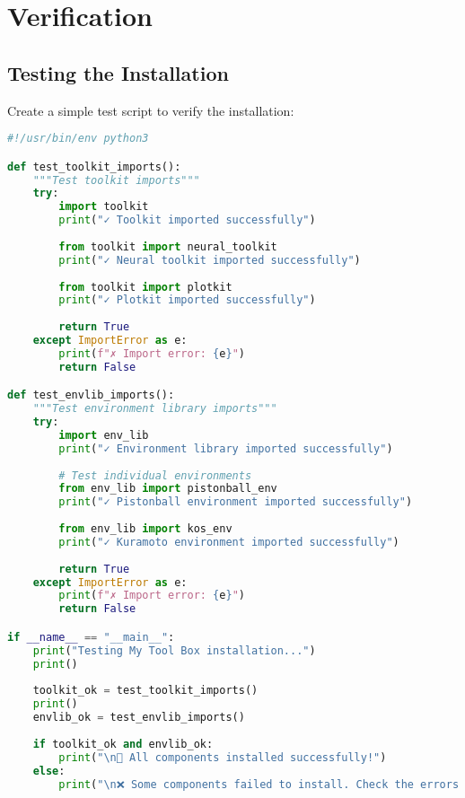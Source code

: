 \section{Verification}

\subsection{Testing the Installation}

Create a simple test script to verify the installation:

\begin{lstlisting}[language=python, caption=Test installation script]
#!/usr/bin/env python3

def test_toolkit_imports():
    """Test toolkit imports"""
    try:
        import toolkit
        print("✓ Toolkit imported successfully")
        
        from toolkit import neural_toolkit
        print("✓ Neural toolkit imported successfully")
        
        from toolkit import plotkit
        print("✓ Plotkit imported successfully")
        
        return True
    except ImportError as e:
        print(f"✗ Import error: {e}")
        return False

def test_envlib_imports():
    """Test environment library imports"""
    try:
        import env_lib
        print("✓ Environment library imported successfully")
        
        # Test individual environments
        from env_lib import pistonball_env
        print("✓ Pistonball environment imported successfully")
        
        from env_lib import kos_env
        print("✓ Kuramoto environment imported successfully")
        
        return True
    except ImportError as e:
        print(f"✗ Import error: {e}")
        return False

if __name__ == "__main__":
    print("Testing My Tool Box installation...")
    print()
    
    toolkit_ok = test_toolkit_imports()
    print()
    envlib_ok = test_envlib_imports()
    
    if toolkit_ok and envlib_ok:
        print("\n🎉 All components installed successfully!")
    else:
        print("\n❌ Some components failed to install. Check the errors above.")
\end{lstlisting}

